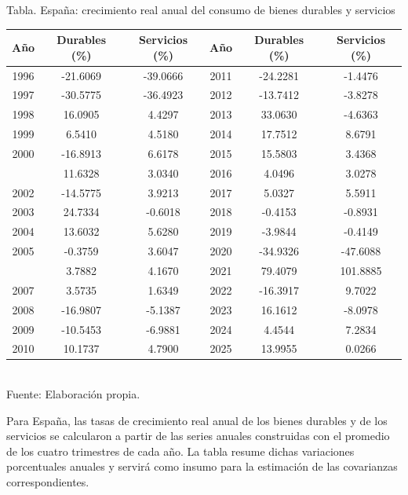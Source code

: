 \documentclass{article}\usepackage[]{graphicx}\usepackage[]{xcolor}
\begin{document}
\begin{center}
Tabla. España: crecimiento real anual del consumo de bienes durables y servicios
\end{center}
\begin{center}

\begin{tabular}{cccccc}
\toprule
Año & Durables (\%) & Servicios (\%) & Año & Durables (\%) & Servicios (\%)\\
\midrule
1996 & -21.6069 & -39.0666 & 2011 & -24.2281 & -1.4476\\
1997 & -30.5775 & -36.4923 & 2012 & -13.7412 & -3.8278\\
1998 & 16.0905 & 4.4297 & 2013 & 33.0630 & -4.6363\\
1999 & 6.5410 & 4.5180 & 2014 & 17.7512 & 8.6791\\
2000 & -16.8913 & 6.6178 & 2015 & 15.5803 & 3.4368\\
\addlinespace
2001 & 11.6328 & 3.0340 & 2016 & 4.0496 & 3.0278\\
2002 & -14.5775 & 3.9213 & 2017 & 5.0327 & 5.5911\\
2003 & 24.7334 & -0.6018 & 2018 & -0.4153 & -0.8931\\
2004 & 13.6032 & 5.6280 & 2019 & -3.9844 & -0.4149\\
2005 & -0.3759 & 3.6047 & 2020 & -34.9326 & -47.6088\\
\addlinespace
2006 & 3.7882 & 4.1670 & 2021 & 79.4079 & 101.8885\\
2007 & 3.5735 & 1.6349 & 2022 & -16.3917 & 9.7022\\
2008 & -16.9807 & -5.1387 & 2023 & 16.1612 & -8.0978\\
2009 & -10.5453 & -6.9881 & 2024 & 4.4544 & 7.2834\\
2010 & 10.1737 & 4.7900 & 2025 & 13.9955 & 0.0266\\
\bottomrule
\end{tabular}
\\[0.3em]
{\footnotesize Fuente: Elaboración propia.}
\end{center}


Para España, las tasas de crecimiento real anual de los bienes durables y de los servicios se calcularon a partir de las series anuales construidas con el promedio de los cuatro trimestres de cada año. La tabla resume dichas variaciones porcentuales anuales y servirá como insumo para la estimación de las covarianzas correspondientes.
\end{document}
